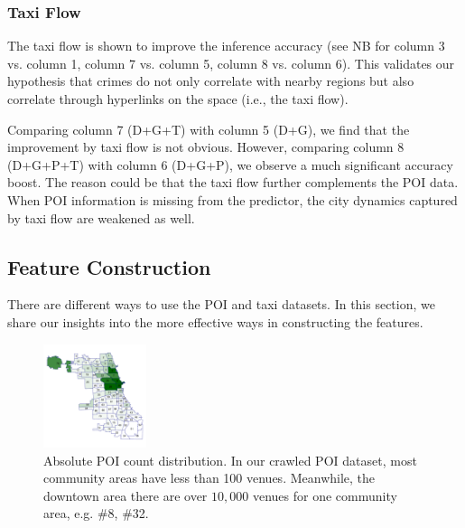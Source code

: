 \vspace{2mm}
\subsubsection{Taxi Flow} 
The taxi flow is shown to improve the inference accuracy (see NB for column 3 vs. column 1, column 7 vs. column 5, column 8 vs. column 6). 
This validates our hypothesis that crimes do not only correlate with nearby regions but also correlate through hyperlinks on the space (i.e., the taxi flow). 

Comparing column 7 (D+G+T) with column 5 (D+G), we find that the improvement by taxi flow is not obvious. However, comparing column 8 (D+G+P+T) with column 6 (D+G+P), we observe a much significant accuracy boost. The reason could be that the taxi flow further complements the POI data. When POI information is missing from the predictor, the city dynamics captured by taxi flow are weakened as well.


\vspace{4mm}
\subsection{Feature Construction}


There are different ways to use the POI and taxi datasets. In this section, we share our insights into the more effective ways in constructing the features. 

\begin{figure}[t]
\centering
\includegraphics[width=0.27\textwidth]{fig/poi-cnt3.pdf}
\caption{Absolute POI count distribution. In our crawled POI dataset, most community areas have less than 100 venues. Meanwhile, the downtown area there are over $10,000$ venues for one community area, e.g. \#8, \#32.}
\label{fig:poi-dist}
\end{figure}

\vfill\eject

